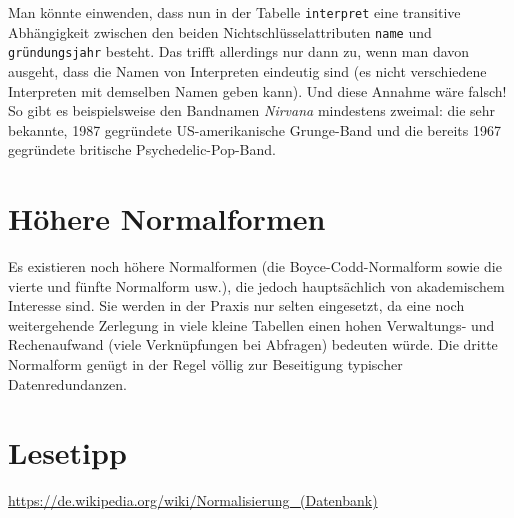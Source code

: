 Man könnte einwenden, dass nun in der Tabelle \lstinline|interpret| eine 
transitive Abhängigkeit zwischen den beiden Nichtschlüsselattributen
\lstinline|name| und \lstinline|gründungsjahr| besteht. Das trifft allerdings 
nur dann zu, wenn man davon ausgeht, dass die Namen von Interpreten
eindeutig sind (es nicht verschiedene Interpreten mit demselben Namen geben 
kann). Und diese Annahme wäre falsch! So gibt es beispielsweise den Bandnamen 
\emph{Nirvana} mindestens zweimal: die sehr bekannte, 1987 gegründete 
US-amerikanische Grunge-Band und die bereits 1967 gegründete britische
Psychedelic-Pop-Band.


\section{Höhere Normalformen \tagZusatz \tagLK}

Es existieren noch höhere Normalformen (die Boyce-Codd-Normalform sowie die 
vierte und fünfte Normalform usw.), die jedoch hauptsächlich von akademischem 
Interesse sind. Sie werden in der Praxis nur selten eingesetzt, da eine noch 
weitergehende Zerlegung in viele kleine Tabellen einen hohen Verwaltungs- und 
Rechenaufwand (viele Verknüpfungen bei Abfragen) bedeuten würde. Die dritte 
Normalform genügt in der Regel völlig zur Beseitigung typischer 
Datenredundanzen.


\section{Lesetipp \tagZusatz \tagLK}

\url{https://de.wikipedia.org/wiki/Normalisierung\_(Datenbank)}
